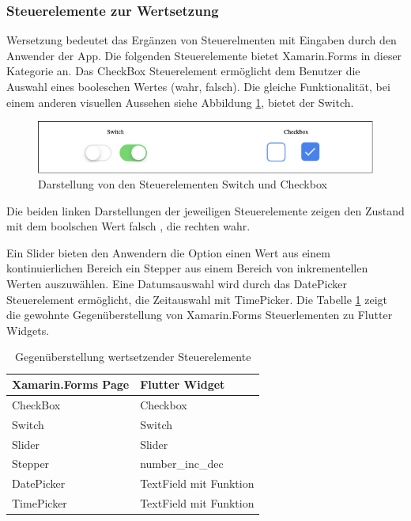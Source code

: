 

\subsubsection{Steuerelemente zur Wertsetzung}
Wersetzung bedeutet das Ergänzen von Steuerelmenten mit Eingaben durch den Anwender der App.  Die folgenden Steuerelemente bietet Xamarin.Forms in dieser Kategorie an.  Das \glq CheckBox\grq{}  Steuerelement ermöglicht dem Benutzer die Auswahl eines boole­schen Wertes (wahr, falsch).  Die gleiche Funktionalität, bei einem anderen visuellen Aussehen siehe Abbildung  \ref{fig:SwitchCheckbox},  bietet der \glq Switch\grq{}.  

\begin{figure}[!ht]
 \includegraphics[width=\textwidth,height=\textheight,keepaspectratio]{Images/CrossPlattformFrameworks/SwitchTextBox.png}
 \caption{Darstellung von den Steuerelementen \glq Switch\grq{} und \glq Checkbox\grq{}}
 \label{fig:SwitchCheckbox}
\end{figure}
Die beiden linken Darstellungen der jeweiligen Steuerelemente zeigen den Zustand mit dem boolschen Wert falsch , die rechten wahr.

Ein  \glq Slider\grq{}  bieten den Anwendern die Option einen Wert aus einem kontinuierlichen Bereich ein \glq Stepper\grq{}  aus einem Bereich von inkrementellen Werten auszuwählen.  Eine Datumsauswahl wird durch das \glq DatePicker\grq{} Steuerelement ermöglicht,  die Zeitauswahl mit \glq TimePicker\grq{}.  Die Tabelle \ref{tab:valuecontrols} zeigt die gewohnte Gegenüberstellung von Xamarin.Forms Steuerlementen zu Flutter Widgets. 

\begin{table}[!ht]
\begin{tabularx}{\textwidth}{X|X}
   \textbf{Xamarin.Forms Page} & \textbf{Flutter Widget}  \\
\hline
	CheckBox		       				&  Checkbox	 		\\ 
	Switch		       					&  Switch	 		\\ 
	Slider		       					&  Slider	 		\\ 
	Stepper		       				&  number\_inc\_dec	 		\\ 
	DatePicker		       			&  TextField mit Funktion		\\ 
	TimePicker		       			&  TextField mit Funktion	 		\\ 
\end{tabularx}
\caption{Gegenüberstellung wertsetzender Steuerelemente}
 \label{tab:valuecontrols}
\end{table}
 
